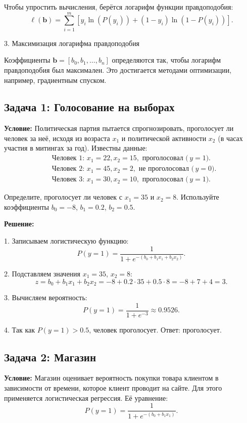 \begin{itemize}
Чтобы упростить вычисления, берётся логарифм функции правдоподобия:
\[
\ell(\mathbf{b}) = \sum_{i=1}^m \left[y_i \ln(P(y_i)) + (1 - y_i) \ln(1 - P(y_i))\right].
\]

3. Максимизация логарифма правдоподобия

Коэффициенты \(\mathbf{b} = [b_0, b_1, \dots, b_n]\) определяются так, чтобы логарифм правдоподобия был максимален. Это достигается методами оптимизации, например, градиентным спуском.


\subsection*{Задача 1: Голосование на выборах}

\textbf{Условие:}  
Политическая партия пытается спрогнозировать, проголосует ли человек за неё, исходя из возраста \(x_1\) и политической активности \(x_2\) (в часах участия в митингах за год).  
Известны данные:  
\[
\begin{aligned}
    &\text{Человек 1: } x_1 = 22, x_2 = 15, \text{ проголосовал (}\, y = 1). \\
    &\text{Человек 2: } x_1 = 45, x_2 = 2, \text{ не проголосовал (}\, y = 0). \\
    &\text{Человек 3: } x_1 = 30, x_2 = 10, \text{ проголосовал (}\, y = 1).
\end{aligned}
\]

Определите, проголосует ли человек с \(x_1 = 35\) и \(x_2 = 8\). Используйте коэффициенты \(b_0 = -8\), \(b_1 = 0.2\), \(b_2 = 0.5\).  

\textbf{Решение:}

1. Записываем логистическую функцию:  
\[
P(y = 1) = \frac{1}{1 + e^{-(b_0 + b_1x_1 + b_2x_2)}}.
\]



2. Подставляем значения \(x_1 = 35\), \(x_2 = 8\):  
\[
z = b_0 + b_1x_1 + b_2x_2 = -8 + 0.2 \cdot 35 + 0.5 \cdot 8 = -8 + 7 + 4 = 3.
\]

3. Вычисляем вероятность:  
\[
P(y = 1) = \frac{1}{1 + e^{-3}} \approx 0.9526.
\]

4. Так как \(P(y = 1) > 0.5\), человек проголосует.  
Ответ: проголосует.


\subsection*{Задача 2: Магазин}

\textbf{Условие:}  
Магазин оценивает вероятность покупки товара клиентом в зависимости от времени, которое клиент проводит на сайте. Для этого применяется логистическая регрессия. Её уравнение:
\[
P(y = 1) = \frac{1}{1 + e^{-(b_0 + b_1x_1)}}.
\]


\end{itemize}
